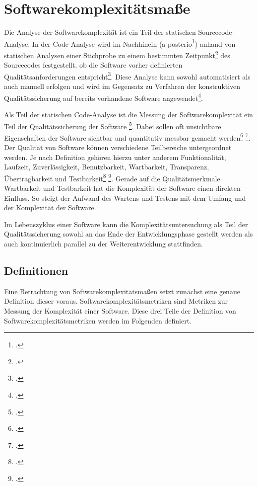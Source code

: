 \chapter{Softwarekomplexitätsmaße}\label{softwarekomplexituxe4tsmauxdfe}

Die Analyse der Softwarekomplexität ist ein Teil der statischen
Sourcecode-Analyse. In der Code-Analyse wird im Nachhinein (a
posterio\footcite[Vgl. ][S. 261]{hoffmannSoftwareQualitat2013}) anhand von statischen
Analysen einer Stichprobe zu einem bestimmten Zeitpunkt\footcite[Vgl. ][S. 86]{ebertSoftwareMetrikenPraxisEinfuhrung1996} des Sourcecodes festgestellt, ob die Software vorher
definierten Qualitätsanforderungen entspricht\footcite[Vgl. ][S. 261]{ebertSoftwareMetrikenPraxisEinfuhrung1996}.
Diese Analyse kann sowohl automatisiert als auch manuell erfolgen und
wird im Gegensatz zu Verfahren der konstruktiven Qualitätssicherung auf
bereits vorhandene Software angewendet\footcite[Vgl. ][S. 261]{hoffmannSoftwareQualitat2013}.

Als Teil der statischen Code-Analyse ist die Messung der
Softwarekomplexität ein Teil der Qualitätssicherung der
Software \footcite[Vgl. ][S. 261]{hoffmannSoftwareQualitat2013}. Dabei
sollen oft unsichtbare Eigenschaften der Software sichtbar und
quantitativ messbar gemacht werden\footcite[Vgl. ][S. 261]{hoffmannSoftwareQualitat2013}
\footcite[Vgl. ][S. 561]{zuseSoftwareComplexityMeasures1991}. Der Qualität von Software können
verschiedene Teilbereiche untergeordnet werden. Je nach Definition
gehören hierzu unter anderem Funktionalität, Laufzeit, Zuverlässigkeit,
Benutzbarkeit, Wartbarkeit, Transparenz, Übertragbarkeit und
Testbarkeit\footcite[Vgl. ][S. 22f]{hoffmannSoftwareQualitat2013} \footcite[Vgl. ][S. 245]{liggesmeyerSoftwareQualitatTestenAnalysieren2009}. Gerade auf die Qualitätsmerkmale Wartbarkeit und
Testbarkeit hat die Komplexität der Software einen direkten Einfluss. So
steigt der Aufwand des Wartens und Testens mit dem Umfang und der
Komplexität der Software.

Im Lebenszyklus einer Software kann die Komplexitätsuntersuchung als
Teil der Qualitätssicherung sowohl an das Ende der Entwicklungsphase
gestellt werden als auch kontinuierlich parallel zu der
Weiterentwicklung stattfinden.

\section{Definitionen}\label{definitionen}

Eine Betrachtung von Softwarekomplexitätsmaßen setzt zunächst eine
genaue Definition dieser voraus. Softwarekomplexitätsmetriken sind
Metriken zur Messung der Komplexität einer Software. Diese drei Teile
der Definition von Softwarekomplexitätsmetriken werden im Folgenden
definiert.


